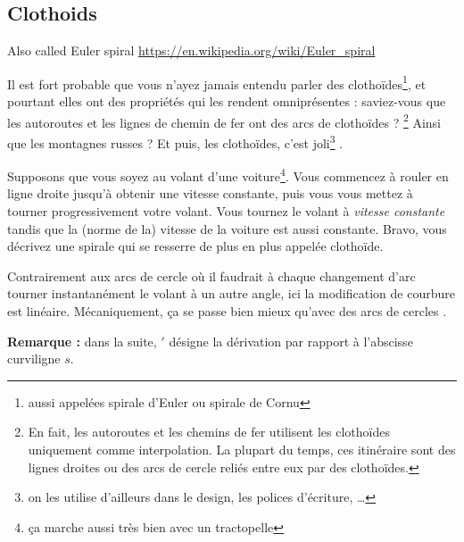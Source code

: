 \documentclass[11pt]{article}
\begin{document}
    \subsection{Clothoids}\label{subsec:clothoids}
    Also called Euler spiral \href{https://en.wikipedia.org/wiki/Euler\_spiral}{https://en.wikipedia.org/wiki/Euler\_spiral}


    Il est fort probable que vous n'ayez jamais entendu parler des clothoïdes\footnote{aussi appelées spirale d'Euler ou spirale de Cornu}, et pourtant elles ont des propriétés qui les rendent omniprésentes : saviez-vous que les autoroutes et les lignes de chemin de fer ont des arcs de clothoïdes ? \cite{baass1982use}\footnote{En fait, les autoroutes et les chemins de fer utilisent les clothoïdes uniquement comme interpolation. La plupart du temps, ces itinéraire sont des lignes droites ou des arcs de cercle reliés entre eux par des clothoïdes.} Ainsi que les montagnes russes ? Et puis, les clothoïdes, c'est joli\footnote{on les utilise d'ailleurs dans le design, les polices d'écriture, …} \cite{baran2010sketching}.

    Supposons que vous soyez au volant d'une voiture\footnote{ça marche aussi très bien avec un tractopelle}. Vous commencez à rouler en ligne droite jusqu'à obtenir une vitesse constante, puis vous vous mettez à tourner progressivement votre volant. Vous tournez le volant à \emph{vitesse constante} tandis que la (norme de la) vitesse de la voiture est aussi constante. Bravo, vous décrivez une spirale qui se resserre de plus en plus appelée clothoïde.


    Contrairement aux arcs de cercle où il faudrait à chaque changement d'arc tourner instantanément le volant à un autre angle, ici la modification de courbure est linéaire. Mécaniquement, ça se passe bien mieux qu'avec des arcs de cercles \cite{cloth}.

    \textbf{Remarque :} dans la suite, $'$ désigne la dérivation par rapport à l'abscisse curviligne $s$.
\end{document}
